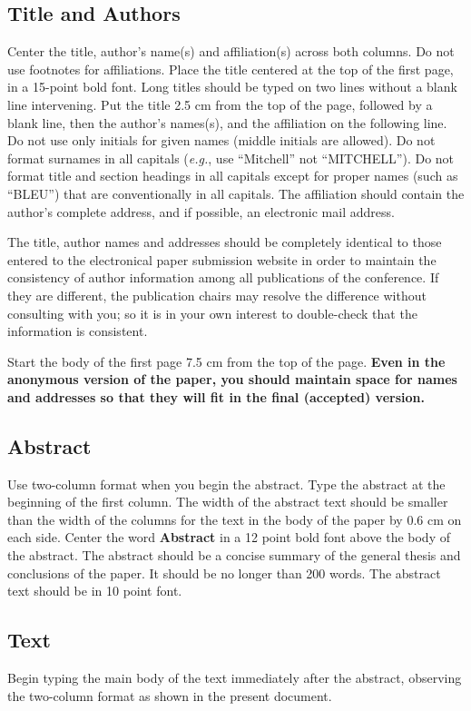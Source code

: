 \documentclass[11pt,a4paper]{article}
\begin{document}
\subsection{Title and Authors}
\label{ssec:title-authors}

Center the title, author's name(s) and affiliation(s) across both columns.
Do not use footnotes for affiliations.
Place the title centered at the top of the first page, in a 15-point bold font.
Long titles should be typed on two lines without a blank line intervening.
Put the title 2.5 cm from the top of the page, followed by a blank line, then the author's names(s), and the affiliation on the following line.
Do not use only initials for given names (middle initials are allowed).
Do not format surnames in all capitals (\emph{e.g.}, use ``Mitchell'' not ``MITCHELL'').
Do not format title and section headings in all capitals except for proper names (such as ``BLEU'') that are
conventionally in all capitals.
The affiliation should contain the author's complete address, and if possible, an electronic mail address.

The title, author names and addresses should be completely identical to those entered to the electronical paper submission website in order to maintain the consistency of author information among all publications of the conference.
If they are different, the publication chairs may resolve the difference without consulting with you; so it is in your own interest to double-check that the information is consistent.

Start the body of the first page 7.5 cm from the top of the page.
\textbf{Even in the anonymous version of the paper, you should maintain space for names and addresses so that they will fit in the final (accepted) version.}


\subsection{Abstract}
Use two-column format when you begin the abstract.
Type the abstract at the beginning of the first column.
The width of the abstract text should be smaller than the
width of the columns for the text in the body of the paper by 0.6 cm on each side.
Center the word \textbf{Abstract} in a 12 point bold font above the body of the abstract.
The abstract should be a concise summary of the general thesis and conclusions of the paper.
It should be no longer than 200 words.
The abstract text should be in 10 point font.

\subsection{Text}
Begin typing the main body of the text immediately after the abstract, observing the two-column format as shown in the present document.
\end{document}
